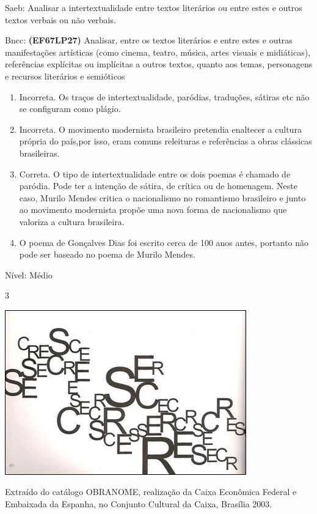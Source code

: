 {Saeb: Analisar a intertextualidade entre textos literários ou entre
estes e outros textos verbais ou não verbais.

Bncc: \textbf{(EF67LP27)} Analisar, entre os textos literários e entre
estes e outras manifestações artísticas (como cinema, teatro, música,
artes visuais e midiáticas), referências explícitas ou implícitas a
outros textos, quanto aos temas, personagens e recursos literários e
semióticos

\begin{enumerate}
\def\labelenumi{\arabic{enumi}.}
\item
  Incorreta. Os traços de intertextualidade, paródias, traduções,
  sátiras etc não se configuram como plágio.
\item
  Incorreta. O movimento modernista brasileiro pretendia enaltecer a
  cultura própria do país,por isso, eram comuns releituras e referências
  a obras clássicas brasileiras.
\item
  Correta. O tipo de intertextualidade entre os dois poemas é chamado de
  paródia. Pode ter a intenção de sátira, de crítica ou de homenagem.
  Neste caso, Murilo Mendes critica o nacionalismo no romantismo
  brasileiro e junto ao movimento modernista propõe uma nova forma de
  nacionalismo que valoriza a cultura brasileira.
\item
  O poema de Gonçalves Dias foi escrito cerca de 100 anos antes,
  portanto não pode ser baseado no poema de Murilo Mendes.
\end{enumerate}

Nível: Médio

\num{3}

\includegraphics[width=4.11458in,height=2.80208in]{./imgSAEB_7_POR/media/image3.png}

Extraído do catálogo OBRANOME, realização da Caixa Econômica Federal e
Embaixada da Espanha, no Conjunto Cultural da Caixa, Brasília 2003.

}
